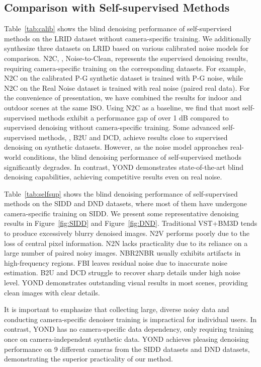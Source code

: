 \documentclass[lettersize,journal]{IEEEtran}
\begin{document}
	\subsection{Comparison with Self-supervised Methods}
	
	Table~\ref{tab:calib} shows the blind denoising performance of self-supervised methods on the LRID dataset without camera-specific training. We additionally synthesize three datasets on LRID based on various calibrated noise models for comparison. N2C, \ie, Noise-to-Clean, represents the supervised denoising results, requiring camera-specific training on the corresponding datasets. For example, N2C on the calibrated P-G synthetic dataset is trained with P-G noise, while N2C on the Real Noise dataset is trained with real noise (paired real data). For the convenience of presentation, we have combined the results for indoor and outdoor scenes at the same ISO. Using N2C as a baseline, we find that most self-supervised methods exhibit a performance gap of over 1 dB compared to supervised denoising without camera-specific training. Some advanced self-supervised methods, \ie, B2U and DCD, achieve results close to supervised denoising on synthetic datasets. However, as the noise model approaches real-world conditions, the blind denoising performance of self-supervised methods significantly degrades. In contrast, YOND demonstrates state-of-the-art blind denoising capabilities, achieving competitive results even on real noise.
	
	Table~\ref{tab:selfsup} shows the blind denoising performance of self-supervised methods on the SIDD and DND datasets, where most of them have undergone camera-specific training on SIDD. We present some representative denoising results in Figure~\ref{fig:SIDD} and Figure~\ref{fig:DND}. 
	Traditional VST+BM3D tends to produce excessively blurry denoised images. N2V performs poorly due to the loss of central pixel information. N2N lacks practicality due to its reliance on a large number of paired noisy images. NBR2NBR usually exhibits artifacts in high-frequency regions. FBI leaves residual noise due to inaccurate noise estimation. B2U and DCD struggle to recover sharp details under high noise level. YOND demonstrates outstanding visual results in most scenes, providing clean images with clear details. 
	
	It is important to emphasize that collecting large, diverse noisy data and conducting camera-specific denoiser training is impractical for individual users. In contrast, YOND has no camera-specific data dependency, only requiring training once on camera-independent synthetic data. 
	YOND achieves pleasing denoising performance on 9 different cameras from the SIDD datasets and DND datasets, demonstrating the superior practicality of our method.
	
\end{document}
